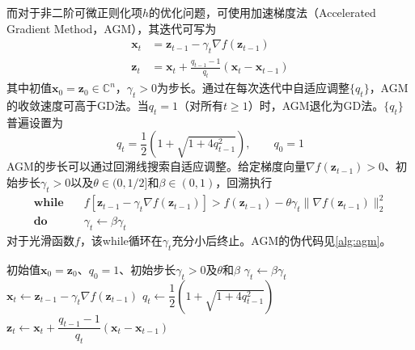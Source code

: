 \documentclass[12pt]{article}
\begin{document}
而对于非二阶可微正则化项$h$的优化问题，可使用加速梯度法（Accelerated Gradient Method，AGM）\label{term:AGM}，其迭代可写为
\begin{align}
    \bm{x}_t&=\bm{z}_{t-1}-\gamma_t\nabla f(\bm{z}_{t-1}) \label{equ:3.15a} \\
    \bm{z}_t&=\bm{x}_t+\frac{q_{t-1}-1}{q_t}(\bm{x}_t-\bm{x}_{t-1}) \label{equ:3.15b}
\end{align}
其中初值$\bm{x}_0=\bm{z}_0\in\mathbb{C}^n$，$\gamma_t>0$为步长。通过在每次迭代中自适应调整$\{q_t\}$，AGM的收敛速度可高于GD法。当$q_t=1$（对所有$t\ge 1$）时，AGM退化为GD法。$\{q_t\}$普遍设置为
\begin{equation}
    q_t=\frac{1}{2}\left(1+\sqrt{1+4q_{t-1}^2}\right),\qquad q_0=1
    \label{equ:3.16}
\end{equation}
AGM的步长可以通过回溯线搜索自适应调整。给定梯度向量$\nabla f(\bm{z}_{t-1})>0$、初始步长$\gamma_t>0$以及$\theta\in(0,1/2]$和$\beta\in(0,1)$，回溯执行
\begin{equation*}
    \begin{aligned}
        \textbf{while}\quad& f\left[\bm{z}_{t-1}-\gamma_t\nabla f(\bm{z}_{t-1})\right]>f(\bm{z}_{t-1})-\theta\gamma_t\|\nabla f(\bm{z}_{t-1})\|_2^2 \\
        \textbf{do}\quad& \gamma_t\gets\beta\gamma_t
    \end{aligned}
\end{equation*}
对于光滑函数$f$，该while循环在$\gamma_t$充分小后终止。AGM的伪代码见\autoref{alg:agm}。
\begin{algorithm}[ht]
    \small
    \caption{加速梯度法（AGM）}
    \label{alg:agm}
    \begin{algorithmic}[1]
        \Require 初始值$\bm{x}_0=\bm{z}_0$、$q_0=1$、初始步长$\gamma_t>0$及$\theta$和$\beta$
                \State $\gamma_t\gets\beta\gamma_t$ 
            \EndWhile
            \State $\bm{x}_t\gets\bm{z}_{t-1}-\gamma_t\nabla f(\bm{z}_{t-1})$ 
            \State $q_t\gets\dfrac{1}{2}\left(1+\sqrt{1+4q_{t-1}^2}\right)$ 
            \State $\bm{z}_t\gets\bm{x}_t+\dfrac{q_{t-1}-1}{q_t}(\bm{x}_t-\bm{x}_{t-1})$ 
        \EndFor
    \end{algorithmic}
\end{algorithm}
\end{document}
